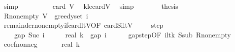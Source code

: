 \begin{isabellebody}
\ simp\isanewline
\ \ \ \ \isamarkupfalse%
\ \isamarkupfalse%
\ {\isachardoublequoteopen}{\isachardot}{\kern0pt}{\isachardot}{\kern0pt}{\isachardot}{\kern0pt}\ {\isasymle}\ card\ V{\isachardoublequoteclose}\ \isamarkupfalse%
\ k{\isacharunderscore}{\kern0pt}le{\isacharunderscore}{\kern0pt}cardV\ \isamarkupfalse%
\ simp\isanewline
\ \ \ \ \isamarkupfalse%
\ \isamarkupfalse%
\ {\isacharquery}{\kern0pt}thesis\ \isakeywordONE{{\isachardot}{\kern0pt}}\isamarkupfalse%
\isanewline
\ \ \isamarkupfalse%
\isanewline
\isanewline
\ \ \isamarkupfalse%
\ R{\isacharunderscore}{\kern0pt}nonempty{\isacharcolon}{\kern0pt}\ {\isachardoublequoteopen}V\ {\isacharminus}{\kern0pt}\ greedy{\isacharunderscore}{\kern0pt}set\ i\ {\isasymnoteq}\ {\isacharbraceleft}{\kern0pt}{\isacharbraceright}{\kern0pt}{\isachardoublequoteclose}\isanewline
\ \ \ \ \isamarkupfalse%
\ remainder{\isacharunderscore}{\kern0pt}nonempty{\isacharunderscore}{\kern0pt}if{\isacharunderscore}{\kern0pt}card{\isacharunderscore}{\kern0pt}ltV{\isacharbrackleft}{\kern0pt}OF\ cardSi{\isacharunderscore}{\kern0pt}lt{\isacharunderscore}{\kern0pt}V{\isacharbrackright}{\kern0pt}\ \isakeywordONE{{\isachardot}{\kern0pt}}\isamarkupfalse%
\isanewline
\isanewline
\ \ \isamarkupfalse%
\ step{\isacharcolon}{\kern0pt}\isanewline
\ \ \ \ {\isachardoublequoteopen}gap\ {\isacharparenleft}{\kern0pt}Suc\ i{\isacharparenright}{\kern0pt}\ {\isasymle}\ {\isacharparenleft}{\kern0pt}{}\ {\isacharminus}{\kern0pt}\ {}\ {\isacharslash}{\kern0pt}\ real\ k{\isacharparenright}{\kern0pt}\ {\isacharasterisk}{\kern0pt}\ gap\ i{\isachardoublequoteclose}\isanewline
\ \ \ \ \isamarkupfalse%
\ gap{\isacharunderscore}{\kern0pt}step{\isacharbrackleft}{\kern0pt}OF\ i{\isacharunderscore}{\kern0pt}lt{\isacharunderscore}{\kern0pt}k\ S{\isacharunderscore}{\kern0pt}sub\ R{\isacharunderscore}{\kern0pt}nonempty{\isacharbrackright}{\kern0pt}\ \isakeywordONE{{\isachardot}{\kern0pt}}\isamarkupfalse%
\isanewline
\isanewline
\ \ \isamarkupfalse%
\ coef{\isacharunderscore}{\kern0pt}nonneg{\isacharcolon}{\kern0pt}\ {\isachardoublequoteopen}{}\ {\isasymle}\ {\isacharparenleft}{\kern0pt}{}\ {\isacharminus}{\kern0pt}\ {}\ {\isacharslash}{\kern0pt}\ real\ k{\isacharparenright}{\kern0pt}{\isachardoublequoteclose}\isanewline
\ \ \isamarkupfalse%
\ {\isacharminus}{\kern0pt}\isanewline

\end{isabellebody}
